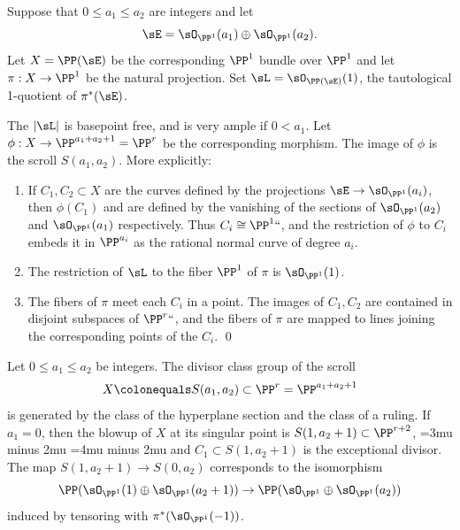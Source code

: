 \begin{npt}
\begin{theorem}
Suppose that $0\leq a_1\leq a_2$ are integers and let
$$
\sE = \sO_{\PP^1}(a_1) \oplus \sO_{\PP^1}(a_2).
$$
Let $X = \PP(\sE)$  be the corresponding $\PP^1$ bundle over $\PP^1$
and let $\pi: X \to \PP^1$ be the natural projection. Set $\sL =
\sO_{\PP(\sE)}(1)$, the tautological 1-quotient of $\pi^*(\sE)$.

The 
$|\sL|$ is basepoint free, and is very ample
%
%
%
if $0<a_1$.
Let $\phi:X\to \PP^{a_1+a_2+1} = \PP^r$ be the corresponding morphism. The
image of $\phi$ is the scroll $S(a_1,a_2).$
More explicitly:
\begin{enumerate}
\item If $C_1, C_2\subset X$ are the curves defined by the projections
$\sE \to \sO_{\PP^1}(a_i)$, then $\phi(C_1)$ and 
are defined by the vanishing
of the sections of $\sO_{\PP^1}(a_2)$ and  $\sO_{\PP^1}(a_1)$
respectively. Thus $C_i \cong \PP^1` `$,
and  the restriction of $\phi$ to $C_i$ embeds it in $\PP^{a_i}$ as the
rational normal curve of degree $a_i$.

\item The restriction of $\sL$ to the fiber $\PP^1$ of $\pi$ is
$\sO_{\PP^1}(1)$.

\item The fibers of $\pi$ meet each $C_i$ in a point. The images of $C_1,
C_2$ are contained in disjoint subspaces of $\PP^r` `$, and the fibers
of $\pi$ are mapped
to lines joining the corresponding points of the $C_i$.
\qed
\end{enumerate}
\end{theorem}

\begin{corollary}
Let $0\leq a_1\leq a_2$ be integers. The divisor class group of the
%
scroll
$$
X\colonequals S(a_1,a_2) \subset \PP^r = \PP^{a_1+a_2+1}
$$
is generated by the class of the hyperplane section and the class
of a ruling. If $a_1 = 0$, then the blowup of $X$ at its singular point
is $S(1, a_2+1)\subset \PP^{r+2}$,
\medmuskip=3mu minus 2mu
\thickmuskip=4mu minus 2mu
and $C_1\subset S(1, a_2+1)$ is the exceptional divisor.  The 
%
map $S(1, a_2+1) \to S(0,a_2)$ corresponds to the isomorphism
$$
\PP(\sO_{\PP^1}(1) \oplus \sO_{\PP^1}(a_2+1)) \to \PP(\sO_{\PP^1}
\oplus \sO_{\PP^1}(a_2))
$$
induced by tensoring with $\pi^*(\sO_{\PP^1}(-1))$.
\end{corollary}
\end{npt}

